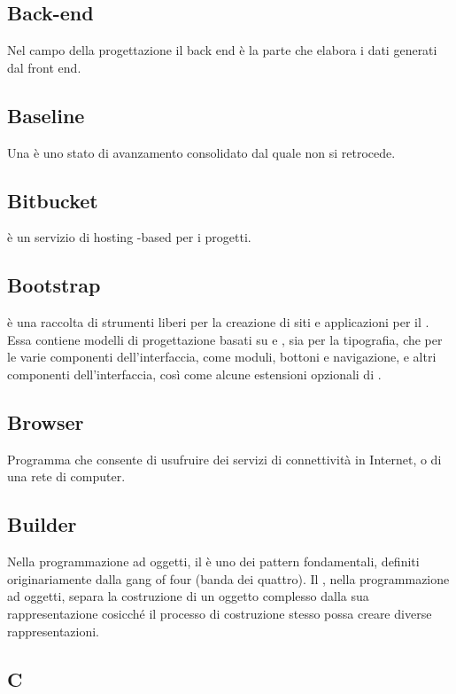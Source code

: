 \subsection*{Back-end}
Nel campo della progettazione  il back end è la parte che elabora i dati generati dal front end.

\subsection*{Baseline}
Una  è uno stato di avanzamento consolidato dal quale non si retrocede. 

\subsection*{Bitbucket}
 è un servizio di hosting -based per i progetti.

\subsection*{Bootstrap}
 è una raccolta di strumenti liberi per la creazione di siti e applicazioni per il . Essa contiene modelli di progettazione basati su  e , sia per la tipografia, che per le varie componenti dell'interfaccia, come moduli, bottoni e navigazione, e altri componenti dell'interfaccia, così come alcune estensioni opzionali di .

\subsection*{Browser}
Programma che consente di usufruire dei servizi di connettività in Internet, o di una rete di computer.

\subsection*{Builder}
Nella programmazione ad oggetti, il  è uno dei pattern fondamentali, definiti originariamente dalla gang of four (banda dei quattro). Il  , nella programmazione ad oggetti, separa la costruzione di un oggetto complesso dalla sua rappresentazione cosicché il processo di costruzione stesso possa creare diverse rappresentazioni.

\newpage

\begin{center}
\Huge\section*{\uppercase{C}}
\end{center}

